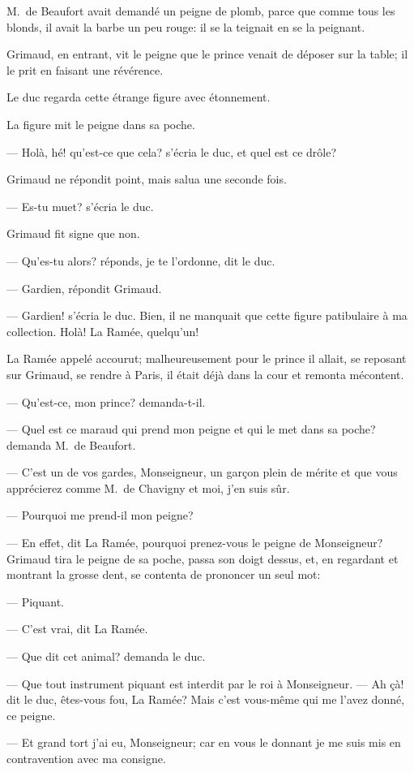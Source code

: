 M.~de Beaufort avait demandé un peigne de plomb, parce que comme tous les blonds, il avait la barbe un peu rouge: il se la teignait en se la peignant.

Grimaud, en entrant, vit le peigne que le prince venait de déposer sur la table; il le prit en faisant une révérence.

Le duc regarda cette étrange figure avec étonnement.

La figure mit le peigne dans sa poche.

— Holà, hé! qu'est-ce que cela? s'écria le duc, et quel est ce drôle?

Grimaud ne répondit point, mais salua une seconde fois.

— Es-tu muet? s'écria le duc.

Grimaud fit signe que non.

— Qu'es-tu alors? réponds, je te l'ordonne, dit le duc.

— Gardien, répondit Grimaud.

— Gardien! s'écria le duc. Bien, il ne manquait que cette figure patibulaire à ma collection. Holà! La Ramée, quelqu'un!

La Ramée appelé accourut; malheureusement pour le prince il allait, se reposant sur Grimaud, se rendre à Paris, il était déjà dans la cour et remonta mécontent.

— Qu'est-ce, mon prince? demanda-t-il.

— Quel est ce maraud qui prend mon peigne et qui le met dans sa poche? demanda M.~de Beaufort.

— C'est un de vos gardes, Monseigneur, un garçon plein de mérite et que vous apprécierez comme M.~de Chavigny et moi, j'en suis sûr.

— Pourquoi me prend-il mon peigne?

— En effet, dit La Ramée, pourquoi prenez-vous le peigne de Monseigneur?
Grimaud tira le peigne de sa poche, passa son doigt dessus, et, en regardant et montrant la grosse dent, se contenta de prononcer un seul mot:

— Piquant.

— C'est vrai, dit La Ramée.

— Que dit cet animal? demanda le duc.

— Que tout instrument piquant est interdit par le roi à Monseigneur.
— Ah çà! dit le duc, êtes-vous fou, La Ramée? Mais c'est vous-même qui me l'avez donné, ce peigne.

— Et grand tort j'ai eu, Monseigneur; car en vous le donnant je me suis mis en contravention avec ma consigne.

